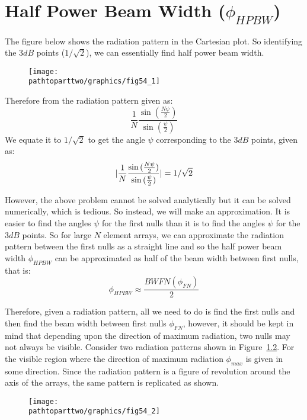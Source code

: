 \chapter{Half Power Beam Width ($\phi_{HPBW}$)}
The figure below shows the radiation pattern in the Cartesian plot. So identifying the $3dB$ points ($1/\sqrt{2}$), we can essentially find half power beam width.
\begin{figure}[h]
\centering
\texttt{[image: \\pathtoparttwo/graphics/fig54\_1]}
\caption{}
\label{54.1}
\end{figure}

Therefore from the radiation pattern given as:
$$
\frac{1}{N} \frac{\sin{(\frac{N \psi}{2})}}{\sin{(\frac{ \psi}{2})}}
$$
We equate it to $1/\sqrt{2}$ to get the angle $\psi$ corresponding to the $3dB$ points, given as:
\begin{equation}
\arrowvert \frac{1}{N} \frac{\sin{(\frac{N \psi}{2})}}{\sin{(\frac{ \psi}{2})}} \arrowvert = 1/\sqrt{2}
\end{equation}

However, the above problem cannot be solved analytically but it can be solved numerically, which is tedious. So instead, we will make an approximation. It is easier to find the angles $\psi$ for the first nulls than it is to find the angles $\psi$ for the $3dB$ points. So for large $N$ element arrays, we can approximate the radiation pattern between the first nulls as a straight line and so the half power beam width $\phi_{HPBW}$ can be approximated as half of the beam width between first nulls, that is:
\begin{equation}
\phi_{HPBW} \approx \frac{BWFN (\phi_{FN})}{2}
\end{equation}

Therefore, given a radiation pattern, all we need to do is find the first nulls and then find the beam width between first nulls $\phi_{FN}$, however, it should be kept in mind that depending upon the direction of maximum radiation, two nulls may not always be visible. Consider two radiation patterns shown in Figure~\ref{54.2}. For the visible region where the direction of maximum radiation $\phi_{max}$ is given in some direction. Since the radiation pattern is a figure of revolution around the axis of the arrays, the same pattern is replicated as shown.
\begin{figure}[h]
\centering
\texttt{[image: \\pathtoparttwo/graphics/fig54\_2]}
\caption{}
\label{54.2}
\end{figure}

